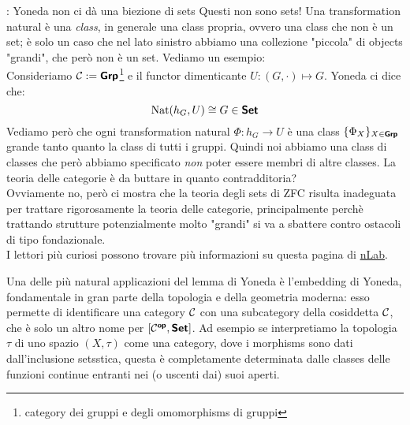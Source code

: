 \documentclass{article}
\renewcommand\C{\mc{C}}
\newcommand\nat{\operatorname{Nat}}
\begin{document}
\begin{remark}{\PHcat: Yoneda non ci dà una biezione di sets}{}
    Questi non sono sets! Una transformation natural è una \textit{class}, in generale una class propria, ovvero una class che non è un set; è solo un caso che nel lato sinistro abbiamo una collezione "piccola" di objects "grandi", che però non è un set. Vediamo un esempio:\\
    Consideriamo $\C := \grpcat$\footnote{category dei gruppi e degli omomorphisms di gruppi} e il functor dimenticante $U : (G, \cdot )\mapsto G$. Yoneda ci dice che:
    \[ \nat (h_G, U) \cong G \in \setcat \]
    Vediamo però che ogni transformation natural $\Phi : h_G \to U$ è una class $\{\Phi_X\}_{X\in\text{\sffamily\textbf{Grp}}}$ grande tanto quanto la class di tutti i gruppi. Quindi noi abbiamo una class di classes che però abbiamo specificato \textit{non} poter essere membri di altre classes. La teoria delle categorie è da buttare in quanto contradditoria?\\
    Ovviamente no, però ci mostra che la teoria degli sets di ZFC risulta inadeguata per trattare rigorosamente la teoria delle categorie, principalmente perchè trattando strutture potenzialmente molto "grandi" si va a sbattere contro ostacoli di tipo fondazionale.\\
    I lettori più curiosi possono trovare più informazioni su questa pagina di \href{https://ncatlab.org/nlab/show/category+theory+and+foundations}{nLab}.
\end{remark}

Una delle più natural applicazioni del lemma di Yoneda è l'embedding di Yoneda, fondamentale in gran parte della topologia e della geometria moderna: esso permette di identificare una category $\C$ con una subcategory della cosiddetta  $\C$, che è solo un altro nome per $[\C^\op,\setcat]$. Ad esempio se interpretiamo la topologia $\tau$ di uno spazio $(X,\tau)$ come una category, dove i morphisms sono dati dall'inclusione setsstica, questa è completamente determinata dalle classes delle funzioni continue entranti nei (o uscenti dai) suoi aperti.
\end{document}
